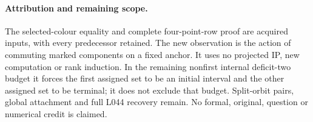 \documentclass[11pt,a4paper]{article}
\begin{document}
\paragraph{Attribution and remaining scope.}
The selected-colour equality and complete four-point-row
proof are acquired inputs, with every predecessor retained.
The new observation is the action of commuting marked
components on a fixed anchor. It uses no projected IP,
new computation or rank induction. In the remaining
nonfirst internal deficit-two budget it forces the first
assigned set to be an initial interval and the other
assigned set to be terminal; it does not exclude that
budget. Split-orbit pairs, global attachment and full
L044 recovery remain. No formal, original, question or
numerical credit is claimed.
\end{document}
